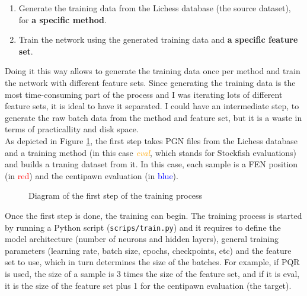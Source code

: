 \begin{enumerate}
\item Generate the training data from the Lichess database (the source dataset), for \textbf{a specific method}.
\item Train the network using the generated training data and \textbf{a specific feature set}.
\end{enumerate}

Doing it this way allows to generate the training data once per method and train the network with different feature sets. Since generating the training data is the most time-consuming part of the process and I was iterating lots of different feature sets, it is ideal to have it separated. I could have an intermediate step, to generate the raw batch data from the method and feature set, but it is a waste in terms of practicallity and disk space. \\

As depicted in Figure \ref{fig:database_to_train_data}, the first step takes PGN files from the Lichess database and a training method (in this case \textcolor{orange}{\textit{eval}}, which stands for Stockfish evaluations) and builds a traning dataset from it. In this case, each sample is a FEN position (in \textcolor{red}{red}) and the centipawn evaluation (in \textcolor{blue}{blue}). \\

\begin{figure}[h]
\centering
{}
\caption{Diagram of the first step of the training process}
\label{fig:database_to_train_data}
\end{figure}


Once the first step is done, the training can begin. The training process is started by running a Python script (\texttt{scrips/train.py}) and it requires to define the model architecture (number of neurons and hidden layers), general training parameters (learning rate, batch size, epochs, checkpoints, etc) and the feature set to use, which in turn determines the size of the batches. For example, if PQR is used, the size of a sample is 3 times the size of the feature set, and if it is eval, it is the size of the feature set plus 1 for the centipawn evaluation (the target).

